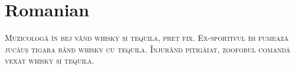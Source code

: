 

\presection\section*{\checkno Romanian}\postsection

\noindent\textsc{Muzicologă în bej vând whisky și tequila, preț fix.
Ex-sportivul își fumează jucăuș țigara bând whisky cu tequila.
Înjurând pițigăiat, zoofobul comandă vexat whisky și tequila.}